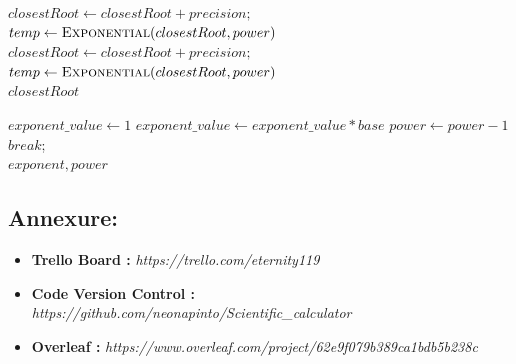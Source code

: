 \documentclass[letterpaper, 11pt]{article}
\begin{document}
\begin{algorithm}
\begin{algorithmic}[1]
                            \State $closestRoot \gets closestRoot +  precision;$
                            \State $temp \gets \Call{Exponential}{closestRoot, power}$
                                \State $closestRoot \gets closestRoot +  precision;$
                                  \State $temp \gets \Call{Exponential}{closestRoot, power}$
                            \EndWhile \\ 
                            \Return $closestRoot$
                        \EndFunction
                        
                            \State $exponent\_value\gets 1$
                                \State $exponent\_value\gets exponent\_value * base$
                                \State $power \gets power - 1$
                                    \State $break$;
                                \EndIf
                            \EndWhile \\ 
                            \Return $exponent, power$
                        \EndFunction
                        
                    \end{algorithmic}
                \end{algorithm}    
           
    \subsection{Annexure:}
        \begin{itemize}
          \item \textbf{Trello Board :} \textit{https://trello.com/eternity119}
          \item \textbf{Code Version Control :} \textit{https://github.com/neonapinto/Scientific\_calculator}
          \item \textbf{Overleaf :} \textit{https://www.overleaf.com/project/62e9f079b389ca1bdb5b238c}
    \end{itemize}
  
\end{document}
